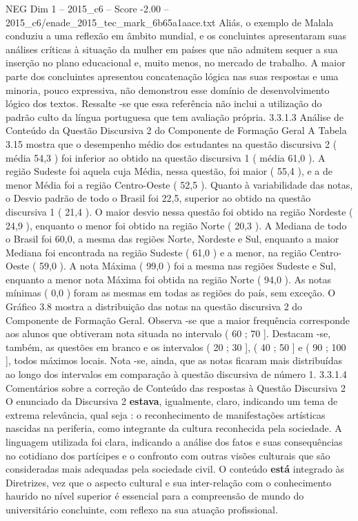 \begin{textsample}{NEG Dim 1 – 2015\_c6 – Score -2.00 – 2015\_c6/enade\_2015\_tec\_mark\_6b65a1aace.txt}
Aliás, o exemplo de Malala conduziu a uma reflexão em âmbito mundial, e os concluintes apresentaram suas análises críticas à situação da mulher em países que não admitem sequer a sua inserção no plano educacional e, muito menos, no mercado de trabalho.
A maior parte dos concluintes apresentou concatenação lógica nas suas respostas e uma minoria, pouco expressiva, não demonstrou esse domínio de desenvolvimento lógico dos textos.
Ressalte -se que essa referência não inclui a utilização do padrão culto da língua portuguesa que tem avaliação própria. 3.3.1.3 Análise de Conteúdo da Questão Discursiva 2 do Componente de Formação Geral A Tabela 3.15 mostra que o desempenho médio dos estudantes na questão discursiva 2 ( média 54,3 ) foi inferior ao obtido na questão discursiva 1 ( média 61,0 ).
A região Sudeste foi aquela cuja Média, nessa questão, foi maior ( 55,4 ), e a de menor Média foi a região Centro-Oeste ( 52,5 ).
Quanto à variabilidade das notas, o Desvio padrão de todo o Brasil foi 22,5, superior ao obtido na questão discursiva 1 ( 21,4 ).
O maior desvio nessa questão foi obtido na região Nordeste ( 24,9 ), enquanto o menor foi obtido na região Norte ( 20,3 ).
A Mediana de todo o Brasil foi 60,0, a mesma das regiões Norte, Nordeste e Sul, enquanto a maior Mediana foi encontrada na região Sudeste ( 61,0 ) e a menor, na região Centro-Oeste ( 59,0 ).
A nota Máxima ( 99,0 ) foi a mesma nas regiões Sudeste e Sul, enquanto a menor nota Máxima foi obtida na região Norte ( 94,0 ).
As notas mínimas ( 0,0 ) foram as mesmas em todas as regiões do país, sem exceção.
O Gráfico 3.8 mostra a distribuição das notas na questão discursiva 2 do Componente de Formação Geral.
Observa -se que a maior frequência corresponde aos alunos que obtiveram nota situada no intervalo ( 60 ; 70 ].
Destacam -se, também, as questões em branco e os intervalos ( 20 ; 30 ], ( 40 ; 50 ] e ( 90 ; 100 ], todos máximos locais.
Nota -se, ainda, que as notas ficaram mais distribuídas ao longo dos intervalos em comparação à questão discursiva de número 1. 3.3.1.4 Comentários sobre a correção de Conteúdo das respostas à Questão Discursiva 2 O enunciado da Discursiva 2 \textbf{estava}, igualmente, claro, indicando um tema de extrema relevância, qual seja : o reconhecimento de manifestações artísticas nascidas na periferia, como integrante da cultura reconhecida pela sociedade.
A linguagem utilizada foi clara, indicando a análise dos fatos e suas consequências no cotidiano dos partícipes e o confronto com outras visões culturais que são consideradas mais adequadas pela sociedade civil.
O conteúdo \textbf{está} integrado às Diretrizes, vez que o aspecto cultural e sua inter-relação com o conhecimento haurido no nível superior é essencial para a compreensão de mundo do universitário concluinte, com reflexo na sua atuação profissional.

\end{textsample}
